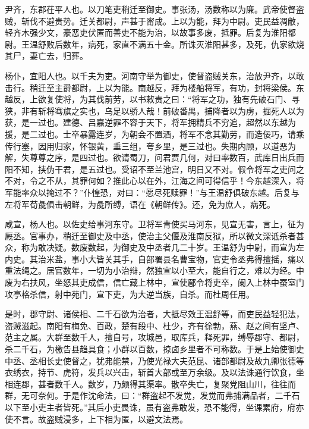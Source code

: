 \documentclass[12pt,UTF8]{ctexbook}
\begin{document}
尹齐，东郡茌平人也。以刀笔吏稍迁至御史。事张汤，汤数称以为廉。武帝使督盗贼，斩伐不避贵势。迁关都尉，声甚于甯成。上以为能，拜为中尉。吏民益凋敝，轻齐木强少文，豪恶吏伏匿而善吏不能为治，以故事多废，抵罪。后复为淮阳都尉。王温舒败后数年，病死，家直不满五十金。所诛灭淮阳甚多，及死，仇家欲烧其尸，妻亡去，归葬。



杨仆，宜阳人也。以千夫为吏。河南守举为御史，使督盗贼关东，治放尹齐，以敢击行。稍迁至主爵都尉，上以为能。南越反，拜为楼船将军，有功，封将梁侯。东越反，上欲复使将，为其伐前劳，以书敕责之曰：“将军之功，独有先破石门、寻狭，非有斩将骞旗之实也，乌足以骄人哉！前破番禺，捕降者以为虏，掘死人以为获，是一过也。建德、吕嘉逆罪不容于天下，将军拥精兵不穷追，超然以东越为援，是二过也。士卒暴露连岁，为朝会不置酒，将军不念其勤劳，而造佞巧，请乘传行塞，因用归家，怀银黄，垂三组，夸乡里，是三过也。失期内顾，以道恶为解，失尊尊之序，是四过也。欲请蜀刀，问君贾几何，对曰率数百，武库日出兵而阳不知，挟伪干君，是五过也。受诏不至兰池宫，明日又不对。假令将军之吏问之不对，令之不从，其罪何如？推此心以在外，江海之间可得信乎！今东越深入，将军能率众以掩过不？”仆惶恐，对曰：“愿尽死赎罪！”与王温舒俱破东越。后复与左将军荀彘俱击朝鲜，为彘所缚，语在《朝鲜传》。还，免为庶人，病死。



咸宣，杨人也。以佐史给事河东守。卫将军青使买马河东，见宣无害，言上，征为厩丞。官事办，稍迁至御史及中丞，使治主父偃及淮南反狱，所以微文深诋杀者甚众，称为敢决疑。数废数起，为御史及中丞者几二十岁。王温舒为中尉，而宣为左内史。其治米盐，事小大皆关其手，自部署县名曹宝物，官吏令丞弗得擅摇，痛以重法绳之。居官数年，一切为小治辩，然独宣以小至大，能自行之，难以为经。中废为右扶风，坐怒其吏成信，信亡藏上林中，宣使郿令将吏卒，阑入上林中蚕室门攻亭格杀信，射中苑门，宣下吏，为大逆当族，自杀。而杜周任用。



是时，郡守尉、诸侯相、二千石欲为治者，大抵尽效王温舒等，而吏民益轻犯法，盗贼滋起。南阳有梅免、百政，楚有段中、杜少，齐有徐勃，燕、赵之间有坚卢、范主之属。大群至数千人，擅自号，攻城邑，取库兵，释死罪，缚辱郡守、都尉，杀二千石，为檄告县趋具食；小群以百数，掠卤乡里者不可称数。于是上始使御史中丞、丞相长史使督之，犹弗能禁，乃使光禄大夫范昆、诸部都尉及故九卿张德等衣绣衣，持节、虎符，发兵以兴击，斩首大部或至万余级。及以法诛通行饮食，坐相连郡，甚者数千人。数岁，乃颇得其渠率。散卒失亡，复聚党阻山川，往往而群，无可奈何。于是作沈命法，曰：“群盗起不发觉，发觉而弗捕满品者，二千石以下至小吏主者皆死。”其后小吏畏诛，虽有盗弗敢发，恐不能得，坐课累府，府亦使不言。故盗贼浸多，上下相为匿，以避文法焉。
\end{document}
